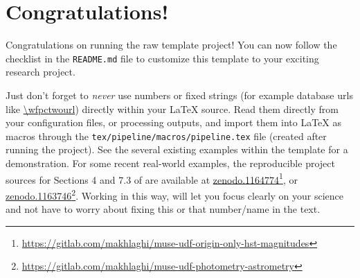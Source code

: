 \documentclass[10pt, twocolumn]{article}
\begin{document}

\thispagestyle{firststyle}





\section{Congratulations!}
Congratulations on running the raw template project! You can now follow the
checklist in the \texttt{README.md} file to customize this template to your
exciting research project.

Just don't forget to \emph{never} use numbers or fixed strings (for example
database urls like \url{\wfpctwourl}) directly within your \LaTeX{}
source. Read them directly from your configuration files, or processing
outputs, and import them into \LaTeX{} as macros through the
\texttt{tex/pipeline/macros/pipeline.tex} file (created after running the
project). See the several existing examples within the template for a
demonstration. For some recent real-world examples, the reproducible
project sources for Sections 4 and 7.3 of \citet{bacon17} are available at
\href{https://doi.org/10.5281/zenodo.1164774}{zenodo.1164774}\footnote{\url{https://gitlab.com/makhlaghi/muse-udf-origin-only-hst-magnitudes}},
or
\href{https://doi.org/10.5281/zenodo.1163746}{zenodo.1163746}\footnote{\url{https://gitlab.com/makhlaghi/muse-udf-photometry-astrometry}}. Working
in this way, will let you focus clearly on your science and not have to
worry about fixing this or that number/name in the text.
\end{document}
